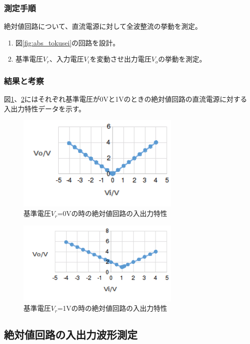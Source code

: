 \documentclass[11pt,a4j]{jsarticle}
\begin{document}
   \subsubsection{測定手順}
    絶対値回路について、直流電源に対して全波整流の挙動を測定。
    \begin{enumerate}
    \item 図\ref{fig:abs_tokusei}の回路を設計。
    \item 基準電圧$V_r$、入力電圧$V_i$を変動させ出力電圧$V_o$の挙動を測定。
    \end{enumerate}
    
   \subsubsection{結果と考察}
    
    図\ref{fig:2_Vr0}、\ref{fig:2_Vr1}にはそれぞれ基準電圧が0Vと1Vのときの絶対値回路の直流電源に対する入出力特性データを示す。
    
    \begin{figure}[htbp]
  \centering
  \includegraphics[width=8cm,clip]{2_Vr0.png}
  \caption{基準電圧$V_r$=0Vの時の絶対値回路の入出力特性}
  \label{fig:2_Vr0}
 \end{figure}%
    
    \begin{figure}[htbp]
  \centering
  \includegraphics[width=8cm,clip]{2_Vr1.png}
  \caption{基準電圧$V_r$=1Vの時の絶対値回路の入出力特性}
  \label{fig:2_Vr1}
 \end{figure}%
    
    
    
  \subsection{絶対値回路の入出力波形測定}
\end{document}
